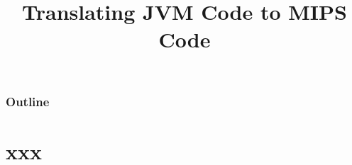 \documentclass[8pt,a4paper,compress]{beamer}
\title{Translating JVM Code to MIPS Code}
\date{}
\begin{document}
\begin{frame}
\vfill
\titlepage
\end{frame}

\begin{frame}
\frametitle{Outline}
\tableofcontents
\end{frame}

\section{xxx}
\begin{frame}[fragile]
\pause


\end{frame}
\end{document}
